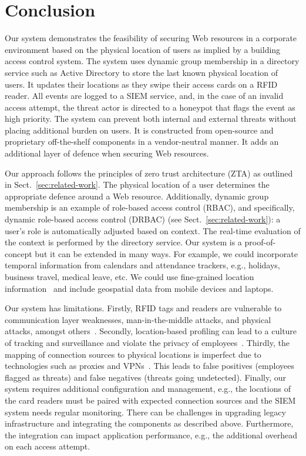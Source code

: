 \section{Conclusion}\label{sec:conclusion}

Our system demonstrates the feasibility of securing Web resources in a
corporate environment based on the physical location of users as
implied by a building access control system.  The system uses dynamic
group membership in a directory service such as Active Directory to
store the last known physical location of users.  It updates their
locations as they swipe their access cards on a RFID reader.  All
events are logged to a SIEM service, and, in the case of an invalid
access attempt, the threat actor is directed to a honeypot that flags
the event as high priority.  The system can prevent both internal and
external threats without placing additional burden on users.  It is
constructed from open-source and proprietary off-the-shelf components
in a vendor-neutral manner.  It adds an additional layer of defence
when securing Web resources.

Our approach follows the principles of zero trust architecture (ZTA)
as outlined in Sect.~\ref{sec:related-work}.  The physical location of
a user determines the appropriate defence around a Web resource.
Additionally, dynamic group membership is an example of role-based
access control (RBAC), and specifically, dynamic role-based access
control (DRBAC) (see Sect.~\ref{sec:related-work}): a user's role is
automatically adjusted based on context.  The real-time evaluation of
the context is performed by the directory service.  Our system is a
proof-of-concept but it can be extended in many ways.  For example, we
could incorporate temporal information from calendars and attendance
trackers, e.g., holidays, business travel, medical leave, etc.  We
could use fine-grained location information~\cite{kriplean-et-al-07}
and include geospatial data from mobile devices and laptops.

Our system has limitations.  Firstly, RFID tags and readers are
vulnerable to communication layer weaknesses, man-in-the-middle
attacks, and physical attacks, amongst
others~\cite{ranasinghe-cole-06}.  Secondly, location-based profiling
can lead to a culture of tracking and surveillance and violate the
privacy of employees~\cite{ostojic-et-al-07}.  Thirdly, the mapping of
connection sources to physical locations is imperfect due to
technologies such as proxies and VPNs~\cite{luna-21}.  This leads to
false positives (employees flagged as threats) and false negatives
(threats going undetected).  Finally, our system requires additional
configuration and management, e.g., the locations of the card readers
must be paired with expected connection sources and the SIEM system
needs regular monitoring.  There can be challenges in upgrading legacy
infrastructure and integrating the components as described above.
Furthermore, the integration can impact application performance, e.g.,
the additional overhead on each access attempt.

